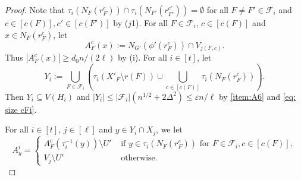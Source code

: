 \documentclass[a4paper, 11pt, reqno]{amsart}
\numberwithin{equation}{section}
\newcommand{\1}{{\rm 1\hspace*{-0.4ex}%
\rule{0.1ex}{1.52ex}\hspace*{0.2ex}}}
\newcommand{\cF}{\mathcal{F}}
\renewcommand{\epsilon}{\varepsilon}
\newcommand{\COMMENT}[1]{}
\begin{document}
\begin{proof}
Note that $\tau_i(N_{F}(r^c_F)) \cap \tau_{i}(N_{F'}(r^{c'}_{F'}))= \emptyset$ for all $F\neq F' \in \cF_i$ and $c\in [c(F)], c'\in [c(F')]$ by ($j$1).\COMMENT{We automatially have that $\tau_i(N_{F}(r^c_F))\cap \tau_i(N_F(r^{c'}_F))=\emptyset$ if $c\neq c'$ since $\tau_i(F^*)$ is a proper embedding of $F^*$.} For all $F \in \cF_i$, $c\in [c(F)]$ and $x\in N_{F}(r^c_F)$, let 
$$A^c_F(x) := N_{G'}(\phi'(r^c_F))\cap V_{j(F,c)}.$$ Thus $|A^c_F(x)| \geq d_0 n/(2\ell)$ by (i). For all $i\in [t]$, let 
$$Y_i:= \bigcup_{F\in \cF_i} \left(\tau_i(X'_F\setminus r(F))\cup \bigcup_{c\in [c(F)]} \tau_i(N_{F}(r^c_F)) \right).$$
Then $Y_i\subseteq V(H_i)$ and $|Y_i|\leq |\cF_i| (n^{1/2} + 2\Delta^2) \leq \epsilon n/\ell$ by \ref{item:A6} and \eqref{eq: size cFi}.

For all $i\in[t]$, $j\in [\ell]$ and $y\in Y_i\cap X_j$, we let 
$$A^i_y =\left\{\begin{array}{ll} A^c_F(\tau^{-1}_i(y))\setminus U' &\text{ if }y\in\tau_{i}(N_{F}(r^c_F)) \text{ for }F\in \cF_i, c\in [c(F)], \\
 V_j\setminus U' &\text{ otherwise.}
\end{array}\right.$$


\end{proof}
\end{document}
